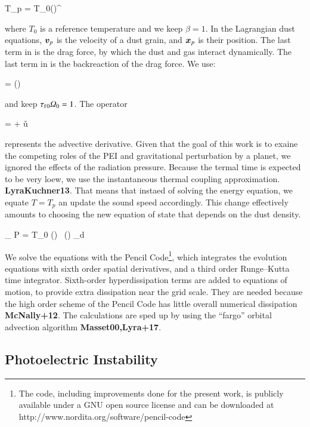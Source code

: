 \documentclass[onecolumn]{report}
\begin{document}
\beq
T_p = T_0\left(\right)^\beta \label{eq:reftemperature}\\
\eeq

where $T_0$ is a reference temperature and we keep $\beta=1$. In the Lagrangian dust equations, ${\boldsymbol{v}}_p$ is the velocity of a dust grain, and ${\boldsymbol{x}}_p$ is their position. The last term in  is the drag force, by which the dust and gas interact dynamically. The last term in  is the backreaction of the drag force. We use:

\beq
\tauf = \left(\right)
\eeq

and keep $\tau_\mathrm{f}{_0}\varOmega_0 = 1$.  The operator

\beq
{} = \ptderiv{} + \v{u} \cdot \del
\eeq

\noindent represents the advective derivative. Given that the goal of this work is to exaine the competing roles of the PEI and gravitational perturbation by a planet, we ignored the effects of the radiation pressure. Because the termal time is expected to be very loew, we use the instantaneous thermal coupling approximation. \textbf{LyraKuchner13}. That means that instaed of solving the energy equation, we equate $T=T_p$ an update the sound speed accordingly. This change effectively amounts to choosing the new equation of state that depends on the dust density.

\beq
\lim_{\taut{}} P = \cv T_0 () \ \left(\right) \varSigma_d
\eeq

We solve the equations with the {\sc Pencil Code}{\footnote{The code, including improvements done for the present work, is publicly available under a GNU open source license and can be downloaded at http://www.nordita.org/software/pencil-code}}, which integrates the evolution equations with sixth order spatial derivatives, and a third order Runge--Kutta time integrator. Sixth-order hyperdissipation terms are added to equations of motion, to provide extra dissipation near the grid scale. They are needed because the high order scheme of the Pencil Code has little overall numerical dissipation \textbf{McNally+12}. The calculations are sped up by using the ``fargo'' orbital advection algorithm \textbf{Masset00,Lyra+17}.


\subsection{Photoelectric Instability}
\end{document}
